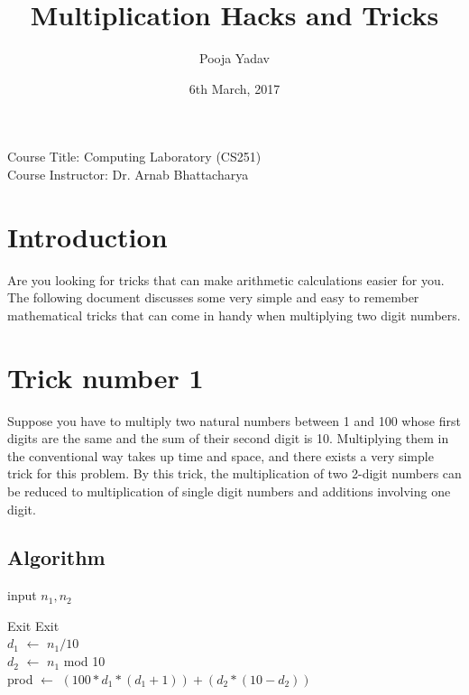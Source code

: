 \documentclass[12pt, a4paper]{article}
\title{Multiplication Hacks and Tricks}
\author{Pooja Yadav}
\date{6th March, 2017}
\begin{document}
\begin{titlepage}
\maketitle
\vspace{4cm}
\centering
Course Title: Computing Laboratory (CS251)\\
Course Instructor: Dr. Arnab Bhattacharya
\end{titlepage}
\section{Introduction}
Are you looking for tricks that can make arithmetic calculations easier for you. The following document discusses some very simple and easy to remember mathematical tricks that can come in handy when multiplying two digit numbers.
\section{Trick number 1}
\label{sec1}
Suppose you have to multiply two natural numbers between 1 and 100 whose first digits are the same and the sum of their second digit is 10. Multiplying them in the conventional way takes up time and space, and there exists a very simple trick for this problem. By this trick, the multiplication of two 2-digit numbers can be reduced to multiplication of single digit numbers and additions involving one digit.
\subsection{Algorithm}
\begin{algorithm}[H]
input $n_1, n_2$
\begin{algorithmic}[1]
\State Exit
\EndIf
{}
\State Exit
\EndIf
\\
$d_1$ $\gets$ $n_1/10$ \\ 
$d_2$ $\gets$ $n_1$ mod 10 \\
prod $\gets$ $(100*d_1*(d_1+1)) + (d_2 * (10 - d_2))$ \\
\end{algorithmic}
\end{algorithm}
\end{document}

